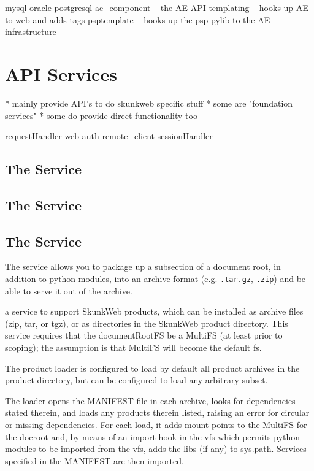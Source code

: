 \documentclass{manual}
\begin{document}
       mysql
       oracle
       postgresql
       ae_component -- the AE API
       templating -- hooks up AE to web and adds tags
       psptemplate -- hooks up the psp pylib to the AE infrastructure
	
\section{API Services}
       * mainly provide API's to do skunkweb specific stuff
       * some are "foundation services"
       * some do provide direct functionality too

       requestHandler
       web
       auth
       remote_client
       sessionHandler

\subsection{The  Service}
\subsection{The  Service}
\subsection{The  Service}
The  service allows you to package up a subsection of
a document root, in addition to python modules, into an archive format
(e.g. \texttt{.tar.gz}, \texttt{.zip}) and be able to serve it out of
the archive.


a service to support SkunkWeb products, which can be installed as
archive files (zip, tar, or tgz), or as directories in the SkunkWeb
product directory.  This service requires that the documentRootFS be a
MultiFS (at least prior to scoping); the assumption is that MultiFS
will become the default fs.

The product loader is configured to load by default all product
archives in the product directory, but can be configured to load any
arbitrary subset.

The loader opens the MANIFEST file in each archive, looks for
dependencies stated therein, and loads any products therein listed,
raising an error for circular or missing dependencies.  For each load,
it adds mount points to the MultiFS for the docroot and, by means of
an import hook in the vfs which permits python modules to be imported
from the vfs, adds the libs (if any) to sys.path.  Services specified
in the MANIFEST are then imported.
\end{document}
